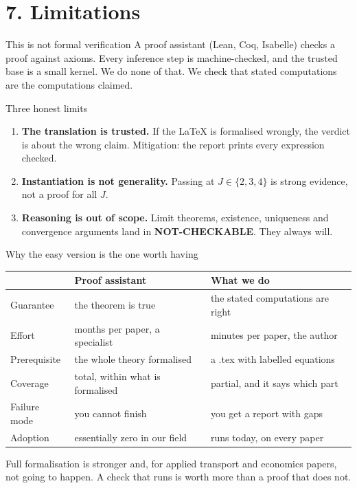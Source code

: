 \documentclass[aspectratio=169,11pt]{beamer}
\newcommand{\code}[1]{{\ttfamily\small #1}}
\newcommand{\NC}{{\color{slate}\bfseries NOT-CHECKABLE}}
\begin{document}
\section{7. Limitations}
\begin{frame}[plain]
  \vfill{}\vfill
\end{frame}

\begin{frame}{This is not formal verification}
  A proof assistant (Lean, Coq, Isabelle) checks a proof against axioms. Every inference step is
  machine-checked, and the trusted base is a small kernel.
  \vfill
  We do none of that. We check that stated computations are the computations claimed.
  \vfill
  \begin{block}{Three honest limits}
    \begin{enumerate}
      \item \textbf{The translation is trusted.} If the LaTeX is formalised wrongly, the verdict is
            about the wrong claim. Mitigation: the report prints every expression checked.
      \item \textbf{Instantiation is not generality.} Passing at $J \in \{2,3,4\}$ is strong
            evidence, not a proof for all $J$.
      \item \textbf{Reasoning is out of scope.} Limit theorems, existence, uniqueness and
            convergence arguments land in \NC. They always will.
    \end{enumerate}
  \end{block}
\end{frame}

\begin{frame}{Why the easy version is the one worth having}
  \begin{center}
  \begin{tabular}{@{}p{}p{}p{}@{}}
    \toprule
     & \textbf{Proof assistant} & \textbf{What we do} \\
    \midrule
    Guarantee      & the theorem is true & the stated computations are right \\[0.4em]
    Effort         & months per paper, a specialist & minutes per paper, the author \\[0.4em]
    Prerequisite   & the whole theory formalised & a \code{.tex} with labelled equations \\[0.4em]
    Coverage       & total, within what is formalised & partial, and it says which part \\[0.4em]
    Failure mode   & you cannot finish & you get a report with gaps \\[0.4em]
    Adoption       & essentially zero in our field & runs today, on every paper \\
    \bottomrule
  \end{tabular}
  \end{center}
  \vfill
  Full formalisation is stronger and, for applied transport and economics papers, not going to
  happen. A check that runs is worth more than a proof that does not.
\end{frame}
\end{document}
